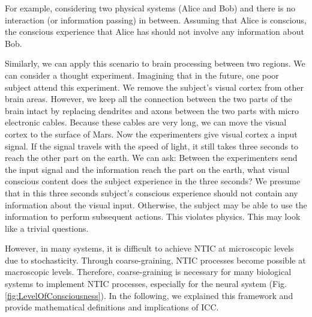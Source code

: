 \documentclass[utf8]{article}
\begin{document}
        
        
        \begin{WritingMaterials}
        For example, considering two physical systems (Alice and Bob) and there is no interaction (or information passing) in between. Assuming that Alice is conscious, the conscious experience that Alice has should not involve any information about Bob. 
        
        Similarly, we can apply this scenario to brain processing between two regions. We can consider a thought experiment. 
        Imagining that in the future, one poor subject attend this experiment. We remove the subject's visual cortex from other brain areas. However, we keep all the connection between the two parts of the brain intact by replacing dendrites and axons between the two parts with micro electronic cables. Because these cables are very long, we can move the visual cortex to the surface of Mars. Now the experimenters give visual cortex a input signal. If the signal travels with the speed of light, it still takes three seconds to reach the other part on the earth. We can ask: Between the experimenters send the input signal and the information reach the part on the earth, what visual conscious content does the subject experience in the three seconds? We presume that in this three seconds subject's conscious experience should not contain any information about the visual input. Otherwise, the subject may be able to use the information to perform subsequent actions. This violates physics. This may look like a trivial questions.
        

        However, in many systems, it is difficult to achieve NTIC at microscopic levels due to stochasticity. Through coarse-graining, NTIC processes become possible at macroscopic levels. Therefore, coarse-graining is necessary for many biological systems to implement NTIC processes, especially for the neural system (Fig. \ref{fig:LevelOfConsciousness}). In the following, we explained this framework and provide mathematical definitions and implications of ICC.  
        \end{WritingMaterials}
        
\end{document}
